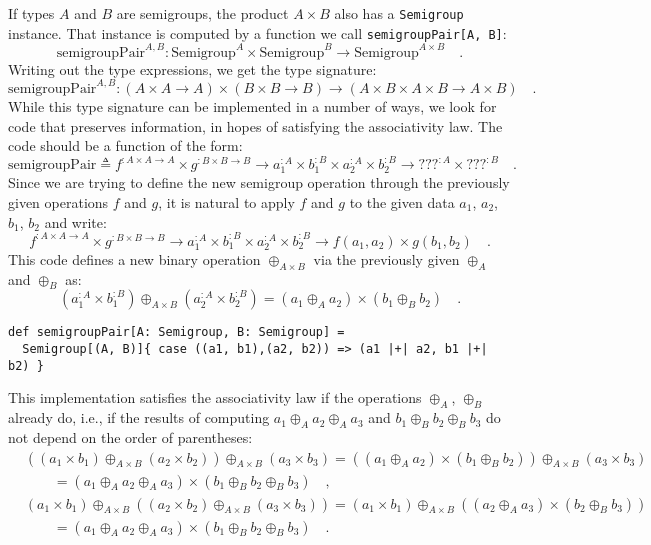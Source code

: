 If types $A$ and $B$ are semigroups, the product $A\times B$ also
has a \lstinline!Semigroup! instance. That instance is computed by
a function we call \lstinline!semigroupPair[A, B]!:
\[
\text{semigroupPair}^{A,B}:\text{Semigroup}^{A}\times\text{Semigroup}^{B}\rightarrow\text{Semigroup}^{A\times B}\quad.
\]
Writing out the type expressions, we get the type signature:
\[
\text{semigroupPair}^{A,B}:\left(A\times A\rightarrow A\right)\times\left(B\times B\rightarrow B\right)\rightarrow\left(A\times B\times A\times B\rightarrow A\times B\right)\quad.
\]
While this type signature can be implemented in a number of ways,
we look for code that preserves information, in hopes of satisfying
the associativity law. The code should be a function of the form:
\[
\text{semigroupPair}\triangleq f^{:A\times A\rightarrow A}\times g^{:B\times B\rightarrow B}\rightarrow a_{1}^{:A}\times b_{1}^{:B}\times a_{2}^{:A}\times b_{2}^{:B}\rightarrow???^{:A}\times???^{:B}\quad.
\]
Since we are trying to define the new semigroup operation through
the previously given operations $f$ and $g$, it is natural to apply
$f$ and $g$ to the given data $a_{1}$, $a_{2}$, $b_{1}$, $b_{2}$
and write:
\[
f^{:A\times A\rightarrow A}\times g^{:B\times B\rightarrow B}\rightarrow a_{1}^{:A}\times b_{1}^{:B}\times a_{2}^{:A}\times b_{2}^{:B}\rightarrow f(a_{1},a_{2})\times g(b_{1},b_{2})\quad.
\]
This code defines a new binary operation $\oplus_{A\times B}$ via
the previously given $\oplus_{A}$ and $\oplus_{B}$ as:
\begin{equation}
(a_{1}^{:A}\times b_{1}^{:B})\oplus_{A\times B}(a_{2}^{:A}\times b_{2}^{:B})=(a_{1}\oplus_{A}a_{2})\times(b_{1}\oplus_{B}b_{2})\quad.\label{eq:semigroup-product-operation-def}
\end{equation}
\begin{lstlisting}
def semigroupPair[A: Semigroup, B: Semigroup] =
  Semigroup[(A, B)]{ case ((a1, b1),(a2, b2)) => (a1 |+| a2, b1 |+| b2) }
\end{lstlisting}
This implementation satisfies the associativity law if the operations
$\oplus_{A}$, $\oplus_{B}$ already do, i.e., if the results of computing
$a_{1}\oplus_{A}a_{2}\oplus_{A}a_{3}$ and $b_{1}\oplus_{B}b_{2}\oplus_{B}b_{3}$
do not depend on the order of parentheses:
\begin{align*}
 & \left(\left(a_{1}\times b_{1}\right)\oplus_{A\times B}\left(a_{2}\times b_{2}\right)\right)\oplus_{A\times B}\left(a_{3}\times b_{3}\right)=\left((a_{1}\oplus_{A}a_{2})\times(b_{1}\oplus_{B}b_{2})\right)\oplus_{A\times B}\left(a_{3}\times b_{3}\right)\\
 & \quad\quad=\left(a_{1}\oplus_{A}a_{2}\oplus_{A}a_{3}\right)\times\left(b_{1}\oplus_{B}b_{2}\oplus_{B}b_{3}\right)\quad,\\
 & \left(a_{1}\times b_{1}\right)\oplus_{A\times B}\left(\left(a_{2}\times b_{2}\right)\oplus_{A\times B}\left(a_{3}\times b_{3}\right)\right)=\left(a_{1}\times b_{1}\right)\oplus_{A\times B}\left((a_{2}\oplus_{A}a_{3})\times(b_{2}\oplus_{B}b_{3})\right)\\
 & \quad\quad=\left(a_{1}\oplus_{A}a_{2}\oplus_{A}a_{3}\right)\times\left(b_{1}\oplus_{B}b_{2}\oplus_{B}b_{3}\right)\quad.
\end{align*}


